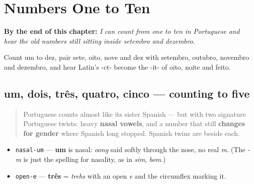 
\chapter{Numbers One to Ten}
\label{ch:pt-numbers-one-to-ten}

\begin{chapteropening}
\textbf{By the end of this chapter:} \emph{I can count from one to ten in Portuguese and hear the old numbers still sitting inside setembro and dezembro.}

Count um to dez, pair sete, oito, nove and dez with setembro, outubro, novembro and dezembro, and hear Latin's -ct- become the -it- of oito, noite and feito.
\end{chapteropening}

\section[um, dois, três, quatro, cinco]{um, dois, três, quatro, cinco — counting to five}

\label{lesson:PT-C06-numeros-1-5}



\begin{quote}
Portuguese counts almost like its sister Spanish — but with two signature Portuguese twists: heavy \textbf{nasal vowels}, and a number that still \textbf{changes for gender} where Spanish long stopped. Spanish twins are beside each.
\end{quote}

\begin{sounds}
\begin{itemize}
\raggedright
  \item \texttt{nasal-um} — \textbf{um} is nasal: \emph{oong} said softly through the nose, no real \emph{m}. (The \emph{-m} is just the spelling for nasality, as in \emph{sim}, \emph{bom}.)
  \item \texttt{open-e} — \textbf{três} = \emph{trehs} with an open \emph{e} and the circumflex marking it.
\end{itemize}
\end{sounds}

